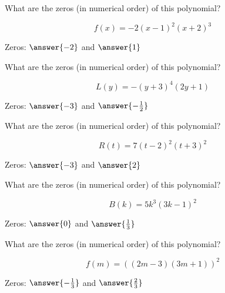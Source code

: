 \documentclass{ximera}
\author{Lee Wayand}
\begin{document}
\begin{example}








\begin{question}


What are the zeros (in numerical order) of this polynomial?

\[
f(x) = -2(x-1)^2(x+2)^3
\]


Zeros:  $\answer{-2}$ and $\answer{1}$

\end{question}





\begin{question}


What are the zeros (in numerical order) of this polynomial?

\[
L(y) = -(y+3)^4(2y+1)
\]

Zeros:  $\answer{-3}$ and $\answer{-\frac{1}{2}}$

\end{question}





\begin{question}


What are the zeros (in numerical order) of this polynomial?

\[
R(t) = 7(t-2)^2(t+3)^2
\]

Zeros:  $\answer{-3}$ and $\answer{2}$

\end{question}





\begin{question}


What are the zeros (in numerical order) of this polynomial?

\[
B(k) =  5k^3 (3k - 1)^2
\]

Zeros:  $\answer{0}$ and $\answer{\frac{1}{3}}$

\end{question}








\begin{question}


What are the zeros (in numerical order) of this polynomial?

\[
f(m) = ((2m - 3)(3m + 1))^2
\]

Zeros:  $\answer{-\frac{1}{3}}$ and $\answer{\frac{2}{3}}$

\end{question}












\end{example}
\end{document}
